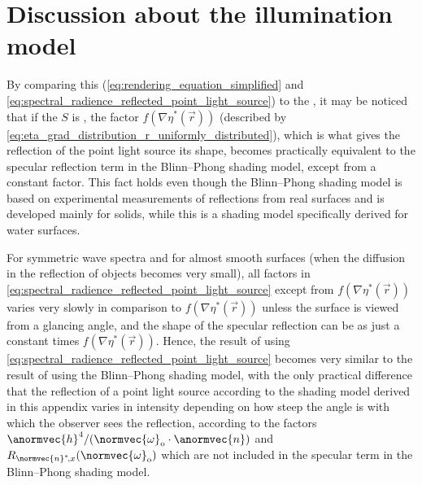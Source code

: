 \section{Discussion about the illumination model}

By comparing this  ( \ref{eq:rendering_equation_simplified} and \ref{eq:spectral_radience_reflected_point_light_source}) to the  \citep{Blinn1977}, it may be noticed that if the  $S$ is , the factor $f(\nabla\eta^*(\vec{r}))$ (described by \eqref{eq:eta_grad_distribution_r_uniformly_distributed}), which is what gives the reflection of the point light source its shape, becomes practically equivalent to the specular reflection term in the Blinn--Phong shading model, except from a constant factor. This fact holds even though the Blinn--Phong shading model is based on experimental measurements of reflections from real surfaces and is developed mainly for solids, while this is a shading model specifically derived for water surfaces.

For symmetric wave spectra and for almost smooth surfaces (when the diffusion in the reflection of objects becomes very small), all factors in \eqref{eq:spectral_radience_reflected_point_light_source} except from $f(\nabla\eta^*(\vec{r}))$ varies very slowly in comparison to $f(\nabla\eta^*(\vec{r}))$ unless the surface is viewed from a glancing angle, and the shape of the specular reflection can be \approximated as just a constant times $f(\nabla\eta^*(\vec{r}))$. Hence, the result of using \eqref{eq:spectral_radience_reflected_point_light_source} becomes very similar to the result of using the Blinn--Phong shading model, with the only practical difference that the reflection of a point light source according to the shading model derived in this appendix varies in intensity depending on how steep the angle is with which the observer sees the reflection, according to the factors $\anormvec{h}^4/(\normvec{\omega}_{\text{o}}\cdot\anormvec{n})$ and $R_{\normvec{n}^*\!,x}(\normvec{\omega}_{\text{o}})$ which are not included in the specular term in the Blinn--Phong shading model.

